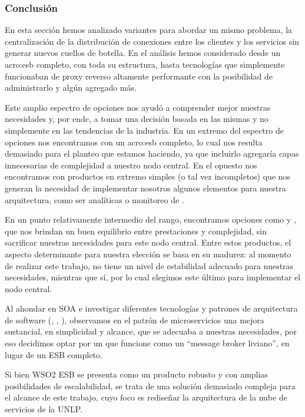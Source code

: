 \subsubsection{Conclusión}

En esta sección hemos analizado variantes para abordar un mismo problema, la centralización de la distribución de conexiones entre los clientes y los servicios sin generar nuevos cuellos de botella. En el análisis hemos considerado desde un \gls{acro:esb} completo, con toda su estructura, hasta tecnologías que simplemente funcionaban de proxy reverso altamente performante con la posibilidad de administrarlo y algún agregado más.

Este amplio espectro de opciones nos ayudó a comprender mejor nuestras necesidades y, por ende, a tomar una decisión basada en las mismas y no simplemente en las tendencias de la industria. En un extremo del espectro de opciones nos encontramos con un \gls{acro:esb} completo, lo cual nos resulta demasiado para el planteo que estamos haciendo, ya que incluirlo agregaría capas innecesarias de complejidad a nuestro nodo central. En el opuesto nos encontramos con productos en extremo simples (o tal vez incompletos) que nos generan la necesidad de implementar nosotros algunos elementos para nuestra arquitectura, como ser analíticas o monitoreo de .

En un punto relativamente intermedio del rango, encontramos opciones como  y , que nos brindan un buen equilibrio entre prestaciones y complejidad, sin sacrificar nuestras necesidades para este nodo central. Entre estos productos, el aspecto determinante para nuestra elección se basa en su madurez: al momento de realizar este trabajo,  no tiene un nivel de estabilidad adecuado para nuestras necesidades, mientras que  sí, por lo cual elegimos este último para implementar el nodo central.

Al ahondar en SOA e investigar diferentes tecnologías y patrones de arquitectura de software (, , ), observamos en el patrón de microservicios una mejora sustancial, en simplicidad y alcance, que se adecuaba a nuestras necesidades, por eso decidimos optar por un  que funcione como un ``message broker liviano'', en lugar de un ESB completo.

Si bien WSO2 ESB se presenta como un producto robusto y con amplias posibilidades de escalabilidad, se trata de una solución demasiado compleja para el alcance de este trabajo, cuyo foco es rediseñar la arquitectura de la nube de servicios de la UNLP.

